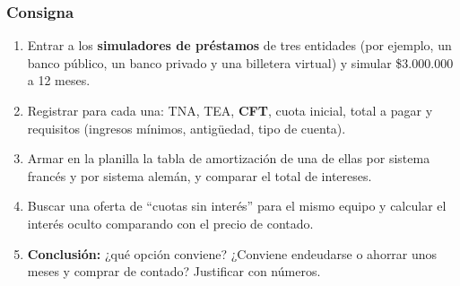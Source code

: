 \subsubsection*{Consigna}
\begin{enumerate}
  \item Entrar a los \textbf{simuladores de préstamos} de tres entidades (por ejemplo, un banco
        público, un banco privado y una billetera virtual) y simular \$3.000.000 a 12 meses.
  \item Registrar para cada una: TNA, TEA, \textbf{CFT}, cuota inicial, total a pagar y
        requisitos (ingresos mínimos, antigüedad, tipo de cuenta).
  \item Armar en la planilla la tabla de amortización de una de ellas por sistema francés y
        por sistema alemán, y comparar el total de intereses.
  \item Buscar una oferta de ``cuotas sin interés'' para el mismo equipo y calcular el interés
        oculto comparando con el precio de contado.
  \item \textbf{Conclusión:} ¿qué opción conviene? ¿Conviene endeudarse o ahorrar unos meses y
        comprar de contado? Justificar con números.
\end{enumerate}

